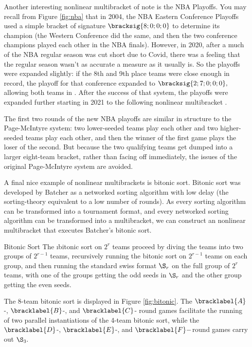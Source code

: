{    Another interesting nonlinear multibracket of note is the NBA Playoffs. You may recall from Figure \ref{fig:nba} that in 2004, the NBA Eastern Conference Playoffs used a simple bracket of signature $\bracksig{8;0;0;0}$ to determine its champion (the Western Conference did the same, and then the two conference champions played each other in the NBA finals). However, in 2020, after a much of the NBA regular season was cut short due to Covid, there was a feeling that the regular season wasn't as accurate a measure as it usually is. So the playoffs were expanded slightly: if the 8th and 9th place teams were close enough in record, the playoff for that conference expanded to $\bracksig{2;7;0;0;0},$ allowing both teams in \cite{wiki_nba1}. After the success of that system, the playoffs were expanded further starting in 2021 to the following nonlinear multibracket \cite{wiki_nba2}.
    

    The first two rounds of the new NBA playoffs are similar in structure to the Page-McIntyre system: two lower-seeded teams play each other and two higher-seeded teams play each other, and then the winner of the first game plays the loser of the second. But because the two qualifying teams get dumped into a larger eight-team bracket, rather than facing off immediately, the issues of the original Page-McIntyre system are avoided.

    A final nice example of nonlinear multibrackets is bitonic sort. Bitonic sort was developed by Batcher \cite{batcher} as a networked sorting algorithm with low delay (the sorting-theory equivalent to a low number of rounds). As every sorting algorithm can be transformed into a tournament format, and every networked sorting algorithm can be transformed into a multibracket, we can construct an nonlinear multibracket that executes Batcher's bitonic sort.

    \begin{definition}{Bitonic Sort}{}
        The \i{bitonic sort} on $2^r$ teams proceed by diving the teams into two groups of $2^{r-1}$ teams, recursively running the bitonic sort on $2^{r-1}$ teams on each group, and then running the standard swiss format $\S_r$ on the full group of $2^r$ teams, with one of the groups getting the odd seeds in $\S_r$ and the other group getting the even seeds.
    \end{definition}

    The 8-team bitonic sort is displayed in Figure \ref{fig:bitonic}. The $\bracklabel{A}$-, $\bracklabel{B}$-, and $\bracklabel{C}$- round games facilitate the running of two parallel instantiations of the 4-team bitonic sort, while the $\bracklabel{D}$-, $\bracklabel{E}$-, and $\bracklabel{F}-$round games carry out $\S_3.$

}
